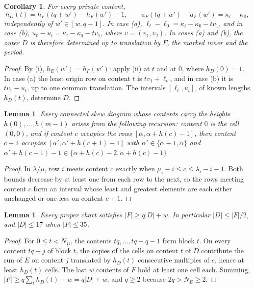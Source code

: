 \documentclass[11pt,a4paper]{amsart}
\numberwithin{equation}{section}
\theoremstyle{plain}
\newtheorem{lemma}[theorem]{Lemma}
\newtheorem{corollary}[theorem]{Corollary}
\theoremstyle{definition}
\begin{document}
\begin{corollary}\label{cor:outer}
For every private content,
\begin{equation}\label{eq:private}
 h_D(t)=h_F(tq+w')-h_F(w')+1,\qquad
 a_F(tq+w')-a_F(w')=\kappa_t-\kappa_0,
\end{equation}
independently of \(w'\in[w,q-1]\).  In case (a), \(\ell_t-\ell_0=\kappa_t-\kappa_0-tv_1\), and in case (b), \(u_0-u_t=\kappa_t-\kappa_0-tv_1\), where \(v=(v_1,v_2)\).  In cases (a) and (b), the outer \(D\) is therefore determined up to translation by \(F\), the marked inner and the period.
\end{corollary}

\begin{proof}
By (i), \(h_E(w')=h_F(w')\); apply (ii) at \(t\) and at \(0\), where \(h_D(0)=1\).  In case (a) the least origin row on content \(t\) is \(tv_1+\ell_t\), and in case (b) it is \(tv_1-u_t\), up to one common translation.  The intervals \([\ell_t,u_t]\), of known lengths \(h_D(t)\), determine \(D\).
\end{proof}

\begin{lemma}\label{lem:heights}
Every connected skew diagram whose contents carry the heights \(h(0),\ldots,h(m-1)\) arises from the following recursion: content \(0\) is the cell \((0,0)\), and if content \(c\) occupies the rows \([\alpha,\alpha+h(c)-1]\), then content \(c+1\) occupies \([\alpha',\alpha'+h(c+1)-1]\) with \(\alpha'\in\{\alpha-1,\alpha\}\) and \(\alpha'+h(c+1)-1\in\{\alpha+h(c)-2,\alpha+h(c)-1\}\).
\end{lemma}

\begin{proof}
In \(\lambda/\mu\), row \(i\) meets content \(c\) exactly when \(\mu_i-i\le c\le\lambda_i-i-1\).  Both bounds decrease by at least one from each row to the next, so the rows meeting content \(c\) form an interval whose least and greatest elements are each either unchanged or one less on content \(c+1\).
\end{proof}

\begin{lemma}\label{lem:size}
Every proper chart satisfies \(|F|\ge q|D|+w\).  In particular \(|D|\le|F|/2\), and \(|D|\le17\) when \(|F|\le35\).
\end{lemma}

\begin{proof}
For \(0\le t<N_D\), the contents \(tq,\ldots,tq+q-1\) form block \(t\).  On every content \(tq+j\) of block \(t\), the copies of the cells on content \(t\) of \(D\) contribute the run of \(E\) on content \(j\) translated by \(h_D(t)\) consecutive multiples of \(e\), hence at least \(h_D(t)\) cells.  The last \(w\) contents of \(F\) hold at least one cell each.  Summing, \(|F|\ge q\sum_th_D(t)+w=q|D|+w\), and \(q\ge2\) because \(2q>N_E\ge2\).
\end{proof}
\end{document}
